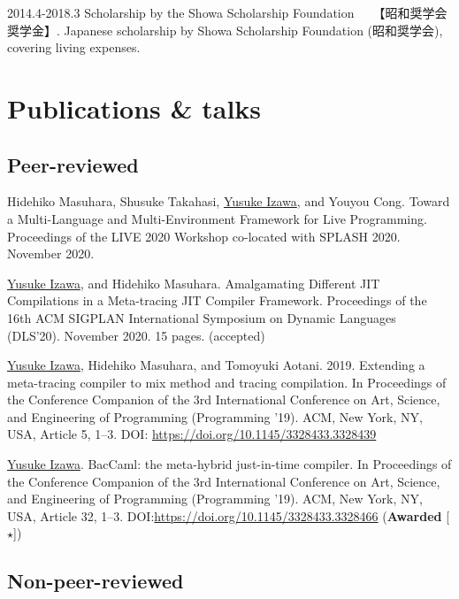 \documentclass[11pt]{article} %
\newcommand{\YusukeIzawa}{\underline{Yusuke Izawa}}
\newcommand{\伊澤侑祐}{\underline{伊澤侑祐}}
\newcommand{\jit}{\textsc{JIT} }
\begin{document}

\grant
{2014.4-2018.3}
{Scholarship by the Showa Scholarship Foundation~~~【昭和奨学会奨学金】.}
{Japanese scholarship by Showa Scholarship Foundation (昭和奨学会), covering
  living expenses.}


\section*{Publications \& talks}

\subsection*{Peer-reviewed}

 Hidehiko Masuhara, Shusuke Takahasi, \YusukeIzawa, and Youyou
Cong. Toward a Multi-Language and Multi-Environment Framework for Live Programming.
Proceedings of the LIVE 2020 Workshop co-located with SPLASH 2020. November 2020.
\medskip

 \YusukeIzawa, and Hidehiko Masuhara. Amalgamating Different \jit
Compilations in a Meta-tracing \jit Compiler Framework. Proceedings of the 16th ACM
SIGPLAN International Symposium on Dynamic Languages (DLS'20). November 2020. 15
pages. (accepted)
\medskip

 \YusukeIzawa, Hidehiko Masuhara, and Tomoyuki
Aotani. 2019. Extending a meta-tracing compiler to mix method and tracing
compilation. In Proceedings of the Conference Companion of the 3rd International
Conference on Art, Science, and Engineering of Programming (Programming
’19). ACM, New York, NY, USA, Article 5, 1–3. DOI:
\url{https://doi.org/10.1145/3328433.3328439}
\medskip

 \YusukeIzawa. BacCaml: the meta-hybrid just-in-time compiler. In
Proceedings of the Conference Companion of the 3rd International Conference on
Art, Science, and Engineering of Programming (Programming ’19). ACM, New York,
NY, USA, Article 32, 1–3. DOI:\url{https://doi.org/10.1145/3328433.3328466}
(\textbf{Awarded} [$\star$])
\medskip

\subsection*{Non-peer-reviewed}
\end{document}
